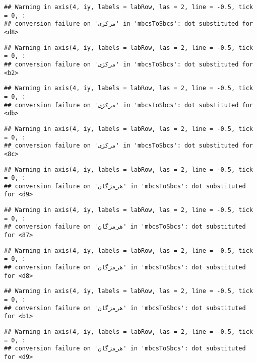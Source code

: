 \documentclass[
]{article}
\begin{document}
\begin{verbatim}
## Warning in axis(4, iy, labels = labRow, las = 2, line = -0.5, tick = 0, :
## conversion failure on 'مرکزی' in 'mbcsToSbcs': dot substituted for <d8>
\end{verbatim}

\begin{verbatim}
## Warning in axis(4, iy, labels = labRow, las = 2, line = -0.5, tick = 0, :
## conversion failure on 'مرکزی' in 'mbcsToSbcs': dot substituted for <b2>
\end{verbatim}

\begin{verbatim}
## Warning in axis(4, iy, labels = labRow, las = 2, line = -0.5, tick = 0, :
## conversion failure on 'مرکزی' in 'mbcsToSbcs': dot substituted for <db>
\end{verbatim}

\begin{verbatim}
## Warning in axis(4, iy, labels = labRow, las = 2, line = -0.5, tick = 0, :
## conversion failure on 'مرکزی' in 'mbcsToSbcs': dot substituted for <8c>
\end{verbatim}

\begin{verbatim}
## Warning in axis(4, iy, labels = labRow, las = 2, line = -0.5, tick = 0, :
## conversion failure on 'هرمزگان' in 'mbcsToSbcs': dot substituted for <d9>
\end{verbatim}

\begin{verbatim}
## Warning in axis(4, iy, labels = labRow, las = 2, line = -0.5, tick = 0, :
## conversion failure on 'هرمزگان' in 'mbcsToSbcs': dot substituted for <87>
\end{verbatim}

\begin{verbatim}
## Warning in axis(4, iy, labels = labRow, las = 2, line = -0.5, tick = 0, :
## conversion failure on 'هرمزگان' in 'mbcsToSbcs': dot substituted for <d8>
\end{verbatim}

\begin{verbatim}
## Warning in axis(4, iy, labels = labRow, las = 2, line = -0.5, tick = 0, :
## conversion failure on 'هرمزگان' in 'mbcsToSbcs': dot substituted for <b1>
\end{verbatim}

\begin{verbatim}
## Warning in axis(4, iy, labels = labRow, las = 2, line = -0.5, tick = 0, :
## conversion failure on 'هرمزگان' in 'mbcsToSbcs': dot substituted for <d9>
\end{verbatim}
\end{document}
